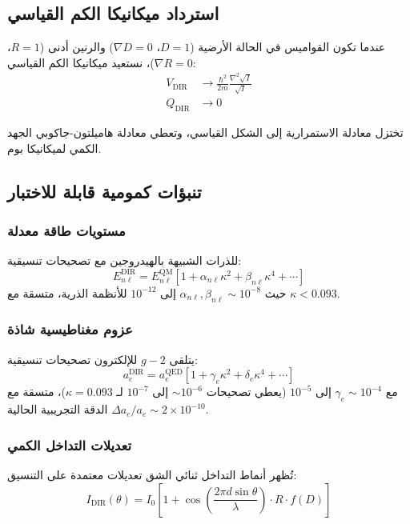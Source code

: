 \documentclass[11pt,a4paper]{article}
\begin{document}
	\subsection{استرداد ميكانيكا الكم القياسي}
	
	عندما تكون القواميس في الحالة الأرضية ($D = 1$، $\nabla D = 0$) والرنين أدنى ($R = 1$، $\nabla R = 0$)، نستعيد ميكانيكا الكم القياسي:
	\begin{align}
		V_{\text{DIR}} &\to \frac{\hbar^2}{2m} \frac{\nabla^2 \sqrt{I}}{\sqrt{I}} \\
		Q_{\text{DIR}} &\to 0
	\end{align}
	
	تختزل معادلة الاستمرارية إلى الشكل القياسي، وتعطي معادلة هاميلتون-جاكوبي الجهد الكمي لميكانيكا بوم.
	
	\subsection{تنبؤات كمومية قابلة للاختبار}
	
	\subsubsection{مستويات طاقة معدلة}
	للذرات الشبيهة بالهيدروجين مع تصحيحات تنسيقية:
	\begin{equation}
		E_{n\ell}^{\text{DIR}} = E_{n\ell}^{\text{QM}} \left[ 1 + \alpha_{n\ell} \kappa^2 + \beta_{n\ell} \kappa^4 + \cdots \right]
	\end{equation}
	حيث $\alpha_{n\ell}, \beta_{n\ell} \sim 10^{-8}$ إلى $10^{-12}$ للأنظمة الذرية، متسقة مع $\kappa < 0.093$.
	
	\subsubsection{عزوم مغناطيسية شاذة}
	يتلقى $g-2$ للإلكترون تصحيحات تنسيقية:
	\begin{equation}
		a_e^{\text{DIR}} = a_e^{\text{QED}} \left[ 1 + \gamma_e \kappa^2 + \delta_e \kappa^4 + \cdots \right]
	\end{equation}
	مع $\gamma_e \sim 10^{-4}$ إلى $10^{-5}$ (يعطي تصحيحات $\sim 10^{-6}$ إلى $10^{-7}$ لـ $\kappa=0.093$)، متسقة مع الدقة التجريبية الحالية $\Delta a_e/a_e \sim 2\times10^{-10}$.
	
	\subsubsection{تعديلات التداخل الكمي}
	تُظهر أنماط التداخل ثنائي الشق تعديلات معتمدة على التنسيق:
	\begin{equation}
		I_{\text{DIR}}(\theta) = I_0 \left[ 1 + \cos\left( \frac{2\pi d \sin\theta}{\lambda} \right) \cdot R \cdot f(D) \right]
	\end{equation}
	
\end{document}
